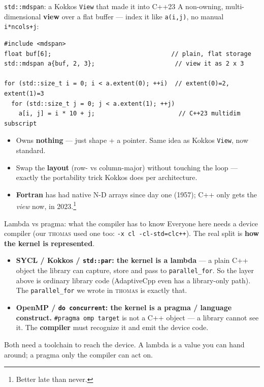 \begin{frame}[fragile]{\texttt{std::mdspan}: a Kokkos \texttt{View} that made it into C++23}
A non-owning, multi-dimensional \textbf{view} over a flat buffer --- index it like
\texttt{a(i,j)}, no manual \texttt{i*ncols+j}:
\begin{verbatim}
#include <mdspan>
float buf[6];                                 // plain, flat storage
std::mdspan a{buf, 2, 3};                      // view it as 2 x 3

for (std::size_t i = 0; i < a.extent(0); ++i)  // extent(0)=2, extent(1)=3
  for (std::size_t j = 0; j < a.extent(1); ++j)
    a[i, j] = i * 10 + j;                       // C++23 multidim subscript
\end{verbatim}
\begin{itemize}
    \item Owns \textbf{nothing} --- just shape + a pointer. Same idea as Kokkos
          \texttt{View}, now standard.
    \item Swap the \textbf{layout} (row- vs column-major) without touching the loop ---
          exactly the portability trick Kokkos does per architecture.
    \item \textbf{Fortran} has had native N-D arrays since day one (1957); C++ only
          gets the \emph{view} now, in 2023.\footnote{Better late than never.}
\end{itemize}
\end{frame}

\begin{frame}[fragile]{Lambda vs pragma: what the compiler has to know}
Everyone here needs a device compiler (our \textsc{thomas} used one too:
\texttt{-x cl -cl-std=clc++}). The real split is \textbf{how the kernel is
represented}.
\begin{itemize}
    \item \textbf{SYCL / Kokkos / \texttt{std::par}: the kernel is a lambda} --- a
          plain C++ object the library can capture, store and pass to
          \texttt{parallel_for}. So the layer above is ordinary library
          code (AdaptiveCpp even has a library-only path). \alert{The \texttt{parallel\_for}
          we wrote in \textsc{thomas} is exactly that.}
    \item \textbf{OpenMP / \texttt{do concurrent}: the kernel is a pragma / language
          construct.} \texttt{#pragma omp target} is not a C++ object --- a
          library cannot see it. The \textbf{compiler} must recognize it and emit the
          device code.
\end{itemize}
\alert{Both need a toolchain to reach the device. A lambda is a value you can hand
around; a pragma only the compiler can act on.}
\end{frame}



